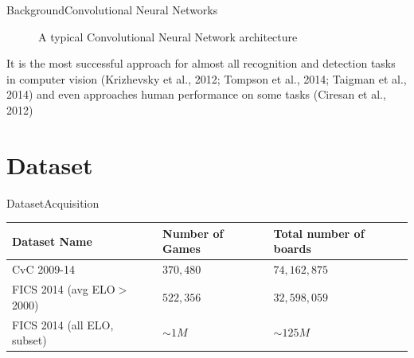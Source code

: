\documentclass[9pt, unknownkeysallowed]{beamer}
\begin{document}
\begin{frame}[shrink=10]{Background}{Convolutional Neural Networks}
\begin{figure}[H]
\caption{A typical Convolutional Neural Network architecture}			
\end{figure}
It is the most successful approach for almost all recognition and
detection tasks in computer vision (Krizhevsky et al., 2012; Tompson et al., 2014;
Taigman et al., 2014) and even approaches human performance on some tasks
(Ciresan et al., 2012)
\end{frame}

\section{Dataset}
\begin{frame}{Dataset}{Acquisition}
\begin{table}[H]
\tiny\centering
\begin{tabular}{@{}lll@{}}
\toprule
Dataset Name & Number of Games 	& Total number of boards  \\
\midrule
CvC 2009-14  & $370,480$	& $74,162,875$             \\ 
FICS 2014 (avg ELO$>$2000)    & $522,356$    	& $32,598,059$      \\
FICS 2014 (all ELO, subset) & $\sim 1M$ & $\sim 125M$\\
\bottomrule
\end{tabular}
\end{table}

\begin{figure}
  \hspace{0.5in}
  \scalebox{.4}{}
  \label{figure:datasets}
\end{figure}
\end{frame}
\end{document}
